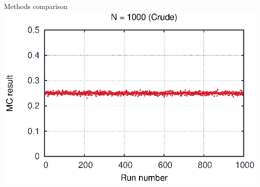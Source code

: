 \begin{emptyslide}{Methods comparison}
{    \includegraphics[width=\columnwidth]{figures/int21000.eps}
  }

\vfill\null
\end{emptyslide}